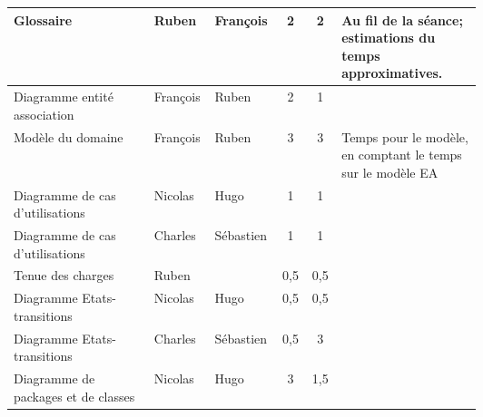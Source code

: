 \begin{longtable}{|p{0.3\linewidth}|l|l|c|c|p{0.3\linewidth}|}
Glossaire                                   & Ruben                                          & François                                  & 2                             & 2                            & Au fil de la séance; estimations du temps approximatives.   \\ \hline
Diagramme entité association                & François                                       & Ruben                                     & 2                             & 1                            &                                                             \\ \hline
Modèle du domaine                           & François                                       & Ruben                                     & 3                             & 3                            & Temps pour le modèle, en comptant le temps sur le modèle EA \\ \hline
Diagramme de cas d'utilisations             & Nicolas                                        & Hugo                                      & 1                             & 1                            &                                                             \\ \hline
Diagramme de cas d'utilisations             & Charles                                        & Sébastien                                 & 1                             & 1                            &                                                             \\ \hline
Tenue des charges                           & Ruben                                          &                                           & 0,5                           & 0,5                          &                                                             \\ \hline
Diagramme Etats-transitions                 & Nicolas                                        & Hugo                                      & 0,5                           & 0,5                          &                                                             \\ \hline
Diagramme Etats-transitions                 & Charles                                        & Sébastien                                 & 0,5                           & 3                            &                                                             \\ \hline
Diagramme de packages et de classes         & Nicolas                                        & Hugo                                      & 3                             & 1,5                          &                                                             \\ \hline

\end{longtable}
